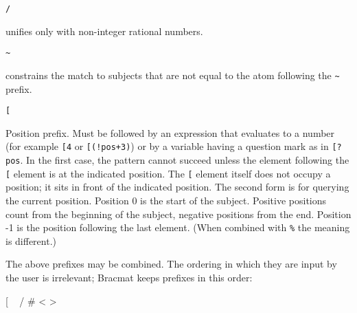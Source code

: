 \documentclass[12pt]{article}
\begin{document}
\begin{description}
\item \verb|/|\par
  unifies only with non-integer rational numbers.

\item \verb|~|\par
  constrains the match to subjects that are not equal to the atom
  following the \verb|~| prefix.

\item \verb|[|\par
  Position prefix. Must be followed by an expression that evaluates to
  a number (for example \verb|[4| or \verb|[(!pos+3)|) or by a
  variable having a question mark as in \verb|[?pos|. In the first
  case, the pattern cannot succeed unless the element following the
  \verb|[| element is at the indicated position. The \verb|[| element
  itself does not occupy a position; it sits in front of the indicated
  position. The second form is for querying the current
  position. Position 0 is the start of the subject. Positive positions
  count from the beginning of the subject, negative positions from the
  end. Position -1 is the position following the last element. (When
  combined with \verb|%| the meaning is different.)
\end{description}

The above prefixes may be combined. The ordering in which they are
input by the user is irrelevant; Bracmat keeps prefixes in this order:
\begin{v}[commandchars=*\{\}]
[ ~ / # < > %
\end{v}
\end{document}

